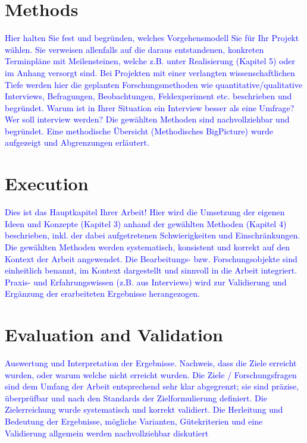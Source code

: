 \documentclass[12pt, a4paper, oneside]{book}   	%
\newcommand{\baaCriteria}[1]{\textcolor{blue}{#1}}
\begin{document}
	\chapter{Methods}
		\baaCriteria{Hier halten Sie fest und begründen, welches Vorgehensmodell Sie für Ihr Projekt wählen. Sie verweisen allenfalls auf die daraus entstandenen, konkreten Terminpläne mit Meilensteinen, welche z.B. unter Realisierung (Kapitel 5) oder im Anhang versorgt sind. Bei Projekten mit einer verlangten wissenschaftlichen Tiefe werden hier die geplanten Forschungsmethoden wie quantitative/qualitative Interviews, Befragungen, Beobachtungen, Feldexperiment etc. beschrieben und begründet. Warum ist in Ihrer Situation ein Interview besser als eine Umfrage? Wer soll interview werden?}
		\baaCriteria{Die gewählten Methoden sind nachvollziehbar und begründet. Eine methodische Übersicht (Methodisches BigPicture) wurde aufgezeigt und Abgrenzungen erläutert.}

	\chapter{Execution}
		\baaCriteria{Dies ist das Hauptkapitel Ihrer Arbeit! Hier wird die Umsetzung der eigenen Ideen und Konzepte (Kapitel 3) anhand der gewählten Methoden (Kapitel 4) beschrieben, inkl. der dabei aufgetretenen Schwierigkeiten und Einschränkungen.}
		\baaCriteria{Die gewählten Methoden werden systematisch, konsistent und korrekt auf den Kontext der Arbeit angewendet. Die Bearbeitungs- bzw. Forschungsobjekte sind einheitlich benannt, im Kontext dargestellt und sinnvoll in die Arbeit integriert. Praxis- und Erfahrungswissen (z.B. aus Interviews) wird zur Validierung und Ergänzung der erarbeiteten Ergebnisse herangezogen. }


	\chapter{Evaluation and Validation}
		\baaCriteria{Auswertung und Interpretation der Ergebnisse. Nachweis, dass die Ziele erreicht wurden, oder warum	welche nicht erreicht wurden.}
		\baaCriteria{Die Ziele / Forschungsfragen sind dem Umfang der Arbeit entsprechend sehr klar abgegrenzt; sie sind präzise, überprüfbar und nach den Standards der Zielformulierung definiert. Die Zielerreichung wurde systematisch und korrekt validiert.}
		\baaCriteria{Die Herleitung und Bedeutung der Ergebnisse, mögliche Varianten, Gütekriterien und eine Validierung allgemein werden nachvollziehbar diskutiert}
	
\end{document}
